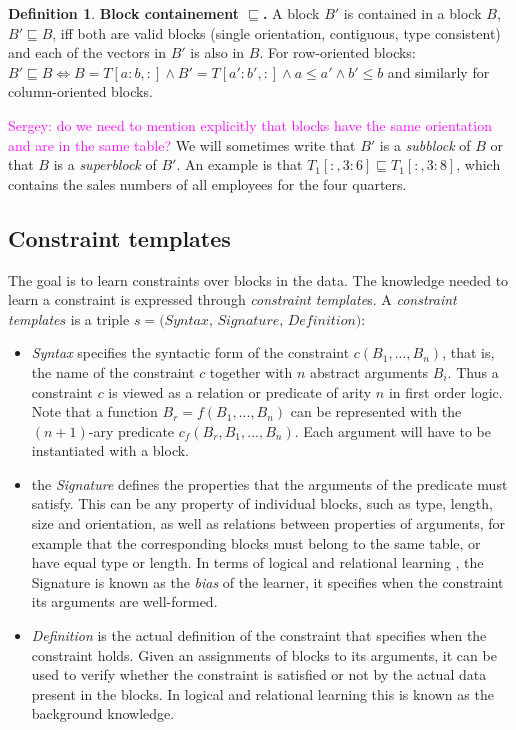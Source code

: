 \documentclass{IEEEtran}
\newcommand{\sergey}[1]{\textcolor{magenta}{{\sc Sergey:} #1}\xspace}
\newcommand{\format}[1]{\textit{#1}\xspace}
\newcommand{\template}{\format{constraint template}}
\newcommand{\CName}{Syntax\xspace}
\newcommand{\CSignature}{Signature\xspace}
\newcommand{\CFunction}{Definition\xspace}
\newcommand{\rangeto}[2]{#1{:}#2}
\theoremstyle{definition}
\newtheorem{definition}{Definition}
\begin{document}
\begin{definition}
\textbf{Block containement $\sqsubseteq$.} 
A block $B'$ is contained in a block $B$, $B' \sqsubseteq B$, iff both are valid blocks (single orientation, contiguous, type consistent) and each of the vectors in $B'$ is also in $B$. For row-oriented blocks: $B' \sqsubseteq B \Leftrightarrow B=T[\rangeto{a}{b},:] \wedge B'=T[\rangeto{a'}{b'},:] \wedge a \leq a' \wedge b' \leq b$ and similarly for column-oriented blocks.
\end{definition}
\sergey{do we need to mention explicitly that blocks have the same orientation and are in the same table?}
We will sometimes write that $B'$ is a \textit{subblock} of $B$ or that $B$ is a \textit{superblock} of $B'$.
%
An example is that $T_1[:,\rangeto{3}{6}] \sqsubseteq T_1[:,\rangeto{3}{8}] $, which contains the sales numbers of all employees for the four quarters.


\subsection{Constraint templates}
The goal is to learn constraints over blocks in the data. The knowledge needed to learn a constraint is expressed through {\template}s.
%
A \template $s$ is a triple $s=\textit{(\CName, \CSignature, \CFunction)}$:
\begin{itemize}
\item
\textit{\CName}  specifies the syntactic form of the constraint $c(B_1, ...,B_n)$, that is, the name of the constraint $c$ together
with $n$ abstract arguments $B_i$. Thus a constraint $c$ is viewed as a relation or predicate of arity $n$ in first order logic. Note that a function $B_r=f(B_1,...,B_n)$ can be represented with the $(n{+}1)$-ary predicate $c_f(B_r,B_1,...,B_n)$. Each argument will have to be instantiated with a block.

\item the \textit{\CSignature} defines the properties that the arguments of the predicate must satisfy. This can be any property of individual blocks, such as type, length, size and orientation, as well as relations between properties of arguments, for example that the corresponding blocks must belong to the same table, or have equal type or length. In terms of logical and relational learning \cite{luc_book}, the \CSignature is known as the {\em bias} of the learner, it specifies when the constraint its arguments are well-formed.

\item \textit{\CFunction} is the actual definition of the constraint that specifies when the constraint holds. Given an assignments of blocks to its arguments, it can be used to verify whether the constraint is satisfied or not by the actual data present in the blocks. %
In logical and relational learning this is known as the background knowledge. %
\end{itemize}
\end{document}
